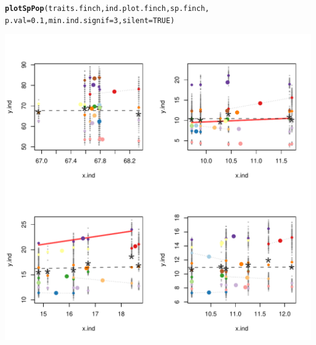 \documentclass[12pt]{article}\usepackage[]{graphicx}\usepackage[]{color}
\makeatletter
\def\maxwidth{ %
  \ifdim\Gin@nat@width>\linewidth
    \linewidth
  \else
    \Gin@nat@width
  \fi
}
\newcommand{\hlnum}[1]{\textcolor[rgb]{0.686,0.059,0.569}{#1}}%
\newcommand{\hlstd}[1]{\textcolor[rgb]{0.345,0.345,0.345}{#1}}%
\newcommand{\hlkwc}[1]{\textcolor[rgb]{0.333,0.667,0.333}{#1}}%
\newcommand{\hlkwd}[1]{\textcolor[rgb]{0.737,0.353,0.396}{\textbf{#1}}}%
\newenvironment{kframe}{%
 \def\at@end@of@kframe{}%
 \ifinner\ifhmode%
  \def\at@end@of@kframe{\end{minipage}}%
  \begin{minipage}{\columnwidth}%
 \fi\fi%
 \def\FrameCommand##1{\hskip\@totalleftmargin \hskip-\fboxsep
 \colorbox{shadecolor}{##1}\hskip-\fboxsep
     \hskip-\linewidth \hskip-\@totalleftmargin \hskip\columnwidth}%
 \MakeFramed {\advance\hsize-\width
   \@totalleftmargin\z@ \linewidth\hsize
   \@setminipage}}%
 {\par\unskip\endMakeFramed%
 \at@end@of@kframe}
\newenvironment{knitrout}{}{} %
\makeatother
\begin{document}
\begin{knitrout}
\color{fgcolor}\begin{kframe}
\begin{alltt}
\hlkwd{plotSpPop}\hlstd{(traits.finch, ind.plot.finch, sp.finch,}
      \hlkwc{p.val} \hlstd{=} \hlnum{0.1}\hlstd{,} \hlkwc{min.ind.signif} \hlstd{=} \hlnum{3}\hlstd{,} \hlkwc{silent} \hlstd{=} \hlnum{TRUE}\hlstd{)}
\end{alltt}
\end{kframe}
\includegraphics[width=\maxwidth]{figure/unnamed-chunk-28-1} 

\end{knitrout}

\newpage
\end{document}
